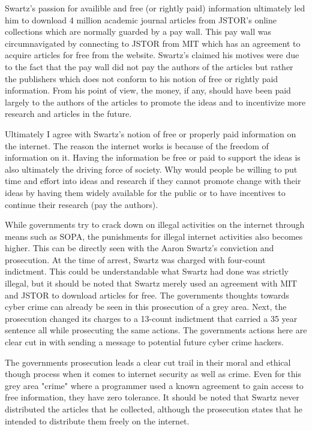 \documentclass[twoside]{article}
\begin{document}
\begin{multicols}{2}
Swartz's passion for availible and free (or rightly paid) information ultimately led him to download 4 million academic journal articles from JSTOR's online collections which are normally guarded by a pay wall. This pay wall was circumnavigated by connecting to JSTOR from MIT which has an agreement to acquire articles for free from the website. Swartz's claimed his motives were due to the fact that the pay wall did not pay the authors of the articles but rather the publishers which does not conform to his notion of free or rightly paid information. From his point of view, the money, if any, should have been paid largely to the authors of the articles to promote the ideas and to incentivize more research and articles in the future. 

Ultimately I agree with Swartz's notion of free or properly paid information on the internet. The reason the internet works is because of the freedom of information on it. Having the information be free or paid to support the ideas is also ultimately the driving force of society. Why would people be willing to put time and effort into ideas and research if they cannot promote change with their ideas by having them widely available for the public or to have incentives to continue their research (pay the authors).

While governments try to crack down on illegal activities on the internet through means such as SOPA, the punishments for illegal internet activities also becomes higher. This can be directly seen with the Aaron Swartz's conviction and prosecution. At the time of arrest, Swartz was charged with four-count indictment. This could be understandable what Swartz had done was strictly illegal, but it should be noted that Swartz merely used an agreement with MIT and JSTOR to download articles for free. The governments thoughts towards cyber crime can already be seen in this prosecution of a grey area. Next, the prosecution changed its charges to a 13-count indictment that carried a 35 year sentence all while prosecuting the same actions. The governments actions here are clear cut in with sending a message to potential future cyber crime hackers. 

The governments prosecution leads a clear cut trail in their moral and ethical though process when it comes to internet security as well as crime. Even for this grey area "crime" where a programmer used a known agreement to gain access to free information, they have zero tolerance. It should be noted that Swartz never distributed the articles that he collected, although the prosecution states that he intended to distribute them freely on the internet. 


\end{multicols}
\end{document}
